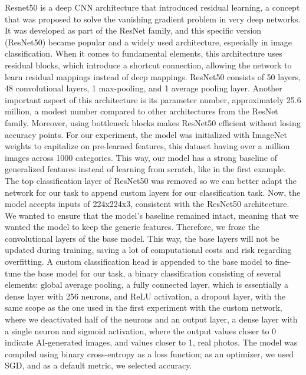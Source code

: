 \documentclass[runningheads]{llncs}
\begin{document}
Resnet50 is a deep CNN architecture that introduced residual learning, a concept that was proposed to solve the vanishing gradient problem in very deep networks. It was developed as part of the ResNet family, and this specific version (ResNet50) became popular and a widely used architecture, especially in image classification. When it comes to fundamental elements, this architecture uses residual blocks, which introduce a shortcut connection, allowing the network to learn residual mappings instead of deep mappings. ResNet50 consists of 50 layers, 48 convolutional layers, 1 max-pooling, and 1 average pooling layer. Another important aspect of this architecture is its parameter number, approximately 25.6 million, a modest number compared to other architectures from the ResNet family. Moreover, using bottleneck blocks makes ResNet50 efficient without losing accuracy points. For our experiment, the model was initialized with ImageNet weights to capitalize on pre-learned features, this dataset having over a million images across 1000 categories. This way, our model has a strong baseline of generalized features instead of learning from scratch, like in the first example. The top classification layer of ResNet50 was removed so we can better adapt the network for our task to append custom layers for our classification task. Now, the model accepts inputs of 224x224x3, consistent with the ResNet50 architecture. We wanted to ensure that the model's baseline remained intact, meaning that we wanted the model to keep the generic features. Therefore, we froze the convolutional layers of the base model. This way, the base layers will not be updated during training, saving a lot of computational costs and risk regarding overfitting. A custom classification head is appended to the base model to fine-tune the base model for our task, a binary classification consisting of several elements: global average pooling, a fully connected layer, which is essentially a dense layer with 256 neurons, and ReLU activation, a dropout layer, with the same scope as the one used in the first experiment with the custom network, where we deactivated half of the neurons and an output layer, a dense layer with a single neuron and sigmoid activation, where the output values closer to 0 indicate AI-generated images, and values closer to 1, real photos. The model was compiled using binary cross-entropy as a loss function; as an optimizer, we used SGD, and as a default metric, we selected accuracy. 
\end{document}
